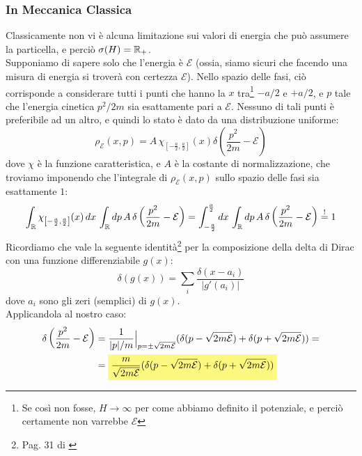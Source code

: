 \documentclass[../../FisicaTeorica.tex]{subfiles}
\begin{document}
\subsubsection{In Meccanica Classica}
Classicamente non vi è alcuna limitazione sui valori di energia che può assumere la particella, e perciò 
$\sigma(H) = \mathbb{R}_+$.\\
Supponiamo di sapere solo che l'energia è $\mathcal{E}$ (ossia, siamo sicuri che facendo una misura di energia si troverà con certezza $\mathcal{E}$). Nello spazio delle fasi, ciò corrisponde a considerare tutti i punti che hanno la $x$ tra\footnote{Se così non fosse, $H\to\infty$ per come abbiamo definito il potenziale, e perciò certamente non varrebbe $\mathcal{E}$} $-a/2$ e $+a/2$, e $p$ tale che l'energia cinetica $p^2/2m$ sia esattamente pari a $\mathcal{E}$. Nessuno di tali punti è preferibile ad un altro, e quindi lo stato è dato da una distribuzione uniforme:
\begin{equation}
\rho_\mathcal{E}(x,p)=A\,\chi_{\left[-\frac{a}{2},\frac{a}{2}\right]}(x)\delta\left(\frac{p^2}{2m}-\mathcal{E}\right)
\label{eqn:stato_classico}
\end{equation}
dove $\chi$ è la funzione caratteristica, e $A$ è la costante di normalizzazione, che troviamo imponendo che l'integrale di $\rho_\mathcal{E}(x,p)$ sullo spazio delle fasi sia esattamente $1$:
\begin{equation}
\int_{\mathbb{R}} \chi_{\left[-\frac{a}{2},\frac{a}{2}\right]}(x)\,dx\, \int_{\mathbb{R}} dp\,A\,\delta\left(\frac{p^2}{2m}-\mathcal{E}\right) =
\int_{-\frac{a}{2}}^{\frac{a}{2}} dx\,\int_{\mathbb{R}} dp\, A\,\delta\left(\frac{p^2}{2m}-\mathcal{E}\right) \overset{!}{=} 1
\label{eqn:normalizzazione_buca_classica}
\end{equation}
Ricordiamo che vale la seguente identità\footnote{Pag. 31 di \cite{spazi_hilbert}} per la composizione della delta di Dirac con una funzione differenziabile $g(x)$:
\[
\delta(g(x))=\sum_{i}\frac{\delta(x-a_i)}{|g'(a_i)|}
\]
dove $a_i$ sono gli zeri (semplici) di $g(x)$.\\
Applicandola al nostro caso:
\begin{align}\nonumber
\delta\left(\frac{p^2}{2m}-\mathcal{E}\right) &=\frac{1}{|p|/m}\Big|_{p=\pm \sqrt{2m\mathcal{E}}} (\delta(p-\sqrt{2m\mathcal{E}})+\delta(p+\sqrt{2m\mathcal{E}}))
= \\
&=\hlc{Yellow}{\frac{m}{\sqrt{2m\mathcal{E}}}(\delta(p-\sqrt{2m\mathcal{E}})+\delta(p+\sqrt{2m\mathcal{E}}))}
\label{eqn:composizione-delta-MC}
\end{align}
\end{document}
